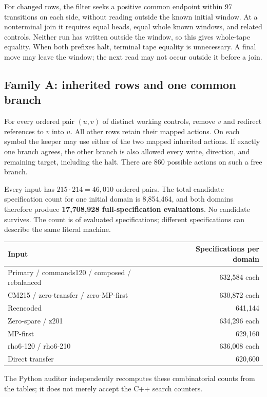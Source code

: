 \documentclass[11pt,letterpaper]{article}
\theoremstyle{definition}
\begin{document}
For changed rows, the filter seeks a positive common endpoint within
97 transitions on each side, without reading outside the known initial
window. At a nonterminal join it requires equal heads, equal whole known
windows, and related controls. Neither run has written outside the
window, so this gives whole-tape equality. When both prefixes halt,
terminal tape equality is unnecessary. A final move may leave the window;
the next read may not occur outside it before a join.

\subsection{Family A: inherited rows and one common branch}

For every ordered pair $(u,v)$ of distinct working controls, remove $v$
and redirect references to $v$ into $u$. All other rows retain their
mapped actions. On each symbol the keeper may use either of the two
mapped inherited actions. If exactly one branch agrees, the other branch
is also allowed every write, direction, and remaining target, including
the halt. There are 860 possible actions on such a free branch.

Every input has $215\cdot214=46,010$ ordered pairs. The total candidate
specification count for one initial domain is 8,854,464, and both domains
therefore produce \textbf{17,708,928 full-specification evaluations}.
No candidate survives. The count is of evaluated specifications; different
specifications can describe the same literal machine.

\begin{center}
\begin{tabular}{@{}lr@{}}
\toprule
Input & Specifications per domain\\
\midrule
Primary / commands120 / composed / rebalanced & 632,584 each\\
CM215 / zero-transfer / zero-MP-first & 630,872 each\\
Reencoded & 641,144\\
Zero-spare / z201 & 634,296 each\\
MP-first & 629,160\\
rho6-120 / rho6-210 & 636,008 each\\
Direct transfer & 620,600\\
\bottomrule
\end{tabular}
\end{center}

The Python auditor independently recomputes these combinatorial counts
from the tables; it does not merely accept the C++ search counters.
\end{document}
